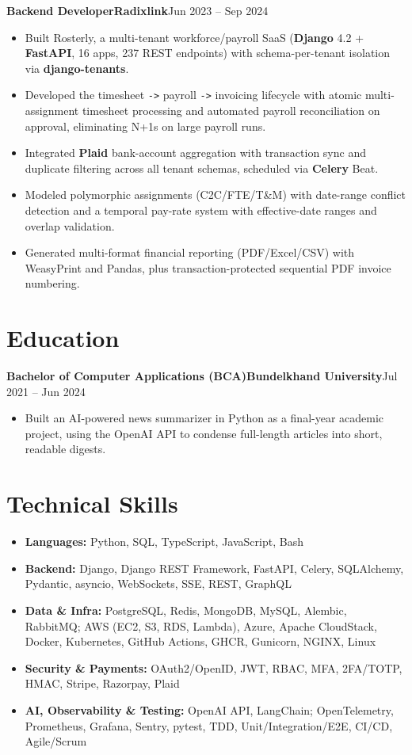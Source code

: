 \documentclass[11pt,a4paper]{article}
\newcommand{\entry}[3]{%
  \vspace{4.5pt}\noindent\textbf{#1}\hfill\textbf{#2}\hfill{\color{subtlegray}#3}\par\vspace{2pt}}
\begin{document}
\entry{Backend Developer}{Radixlink}{Jun 2023 -- Sep 2024}
\begin{itemize}
  \item Built Rosterly, a multi-tenant workforce/payroll SaaS (\textbf{Django} 4.2
        + \textbf{FastAPI}, 16 apps, 237 REST endpoints) with schema-per-tenant
        isolation via \textbf{django-tenants}.
  \item Developed the timesheet \texttt{->} payroll \texttt{->} invoicing
        lifecycle with atomic multi-assignment timesheet processing and automated
        payroll reconciliation on approval, eliminating N+1s on large payroll runs.
  \item Integrated \textbf{Plaid} bank-account aggregation with transaction sync
        and duplicate filtering across all tenant schemas, scheduled via
        \textbf{Celery} Beat.
  \item Modeled polymorphic assignments (C2C/FTE/T\&M) with date-range conflict
        detection and a temporal pay-rate system with effective-date ranges and
        overlap validation.
  \item Generated multi-format financial reporting (PDF/Excel/CSV) with WeasyPrint
        and Pandas, plus transaction-protected sequential PDF invoice numbering.
\end{itemize}

\section{Education}
\entry{Bachelor of Computer Applications (BCA)}{Bundelkhand University}{Jul 2021 -- Jun 2024}
\begin{itemize}
  \item Built an AI-powered news summarizer in Python as a final-year academic
        project, using the OpenAI API to condense full-length articles into short,
        readable digests.
\end{itemize}

\section{Technical Skills}
\begin{itemize}
  \item \textbf{Languages:} Python, SQL, TypeScript, JavaScript, Bash
  \item \textbf{Backend:} Django, Django REST Framework, FastAPI, Celery,
        SQLAlchemy, Pydantic, asyncio, WebSockets, SSE, REST, GraphQL
  \item \textbf{Data \& Infra:} PostgreSQL, Redis, MongoDB, MySQL, Alembic,
        RabbitMQ; AWS (EC2, S3, RDS, Lambda), Azure, Apache CloudStack, Docker,
        Kubernetes, GitHub Actions, GHCR, Gunicorn, NGINX, Linux
  \item \textbf{Security \& Payments:} OAuth2/OpenID, JWT, RBAC, MFA, 2FA/TOTP,
        HMAC, Stripe, Razorpay, Plaid
  \item \textbf{AI, Observability \& Testing:} OpenAI API, LangChain;
        OpenTelemetry, Prometheus,
        Grafana, Sentry, pytest, TDD, Unit/Integration/E2E, CI/CD, Agile/Scrum
\end{itemize}
\end{document}
